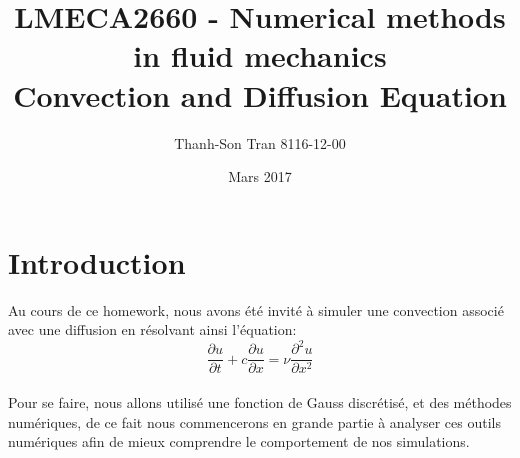 \documentclass{article}
\title{ LMECA2660 - Numerical methods in fluid mechanics \\ Convection and Diffusion Equation}
\author{ Thanh-Son Tran       8116-12-00}
\date{Mars 2017}
\begin{document}
\maketitle
\section{Introduction}
Au cours de ce homework, nous avons été invité à simuler une convection associé avec une diffusion en résolvant ainsi l'équation:\\
\begin{equation}
    \frac{\partial u}{\partial t} + c \frac{\partial u}{\partial x} =  \nu \frac{\partial^2 u}{\partial x^2}
\end{equation}
\\
Pour se faire, nous allons utilisé une fonction de Gauss discrétisé, et des méthodes numériques, de ce fait nous commencerons en grande partie à analyser ces outils numériques afin de mieux comprendre le comportement de nos simulations.
\end{document}
